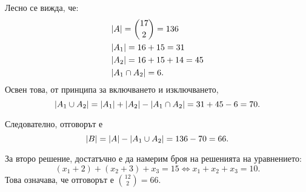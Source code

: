 \begin{solution}
\begin{enumerate}[a)]
    Лесно се вижда, че:
    \begin{align*}
      & \lvert{A}\rvert  = \binom{17}{2} = 136\\
      & \lvert{A_1}\rvert = 16 + 15 = 31\\
      & \lvert{A_2}\rvert = 16 + 15 + 14 = 45\\
      & \lvert{A_1\cap A_2}\rvert = 6.
    \end{align*}
    Освен това, от принципа за включването и изключването, 
    \[\lvert{A_1 \cup A_2}\rvert = \lvert{A_1}\rvert + \lvert{A_2}\rvert - \lvert{A_1\cap A_2}\rvert = 31 + 45 - 6 = 70.\]

    Следователно, отговорът е 
    \[\lvert{B}\rvert = \lvert{A}\rvert - \lvert{A_1 \cup A_2}\rvert = 136 - 70 = 66.\]

    За второ решение, достатъчно е да намерим броя на решенията на уравнението:
    \[(x_1 + 2) + (x_2 + 3) + x_3 = 15 \iff x_1 + x_2 + x_3 = 10.\]
    Това означава, че отговорът е $\binom{12}{2} = 66$.

\end{enumerate}
\end{solution}
